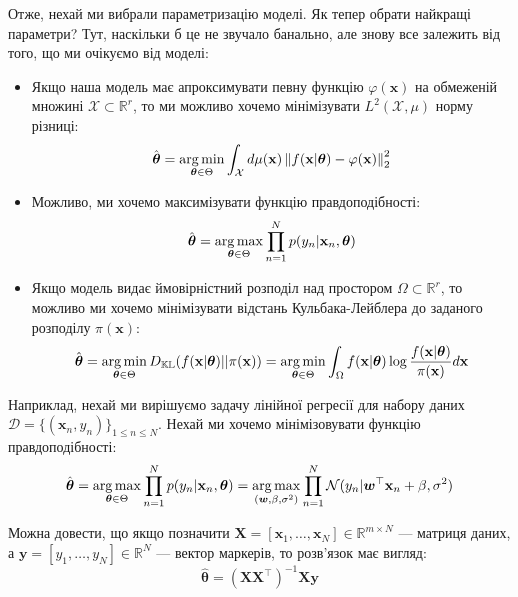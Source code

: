 Отже, нехай ми вибрали параметризацію моделі. Як тепер обрати найкращі параметри?
Тут, наскільки б це не звучало банально, але знову все залежить від того, що ми
очікуємо від моделі:
\begin{itemize}
	\item Якщо наша модель має апроксимувати певну функцію $\varphi(\mathbf{x})$ на 
	обмеженій множині $\mathcal{X} \subset \mathbb{R}^r$, то ми можливо хочемо 
	мінімізувати $L^2(\mathcal{X},\mu)$ норму різниці:
	\begin{equation*}
		\hat{\boldsymbol{\theta}} = \operatorname*{arg\,min}_{\boldsymbol{\theta} \in \Theta} \int_{\mathcal{X}} d\mu(\mathbf{x}) \left\| f(\mathbf{x}|\boldsymbol{\theta}) - \varphi(\mathbf{x}) \right\|_2^2
	\end{equation*}
	\item Можливо, ми хочемо максимізувати функцію правдоподібності:
	\begin{equation*}
		\hat{\boldsymbol{\theta}} = \operatorname*{arg\,max}_{\boldsymbol{\theta} \in \Theta} \prod_{n=1}^N p(y_n|\mathbf{x}_n,\boldsymbol{\theta})
	\end{equation*}
	\item Якщо модель видає ймовірністний розподіл над простором $\Omega \subset \mathbb{R}^r$, то можливо ми хочемо мінімізувати відстань Кульбака-Лейблера до заданого розподілу $\pi(\mathbf{x})$:
	\begin{equation*}
		\hat{\boldsymbol{\theta}} = \operatorname*{arg\,min}_{\boldsymbol{\theta} \in \Theta} D_{\mathbb{KL}}(f(\mathbf{x}|\boldsymbol{\theta})||\pi(\mathbf{x})) = \operatorname*{arg\,min}_{\boldsymbol{\theta} \in \Theta} \int_{\Omega} f(\mathbf{x} | \boldsymbol{\theta}) \log \frac{f(\mathbf{x} | \boldsymbol{\theta})}{\pi(\mathbf{x})}d\mathbf{x}
	\end{equation*}
\end{itemize}

\begin{example}
	Наприклад, нехай ми вирішуємо задачу лінійної регресії для набору даних
	$\mathcal{D} = \{(\mathbf{x}_n, y_n)\}_{1 \leq n \leq N}$. Нехай ми хочемо 
	мінімізовувати функцію правдоподібності:
	\begin{equation}
		\hat{\boldsymbol{\theta}} = \operatorname*{arg\,max}_{\boldsymbol{\theta} \in \Theta} \prod_{n=1}^N p(y_n|\mathbf{x}_n,\boldsymbol{\theta}) = \operatorname*{arg\,max}_{(\boldsymbol{w},\beta,\sigma^2)}\prod_{n=1}^N \mathcal{N}(y_n|\boldsymbol{w}^{\top}\mathbf{x}_n+\beta,\sigma^2)
	\end{equation}

	Можна довести, що якщо позначити $\mathbf{X} = [\mathbf{x}_1,\dots,\mathbf{x}_N] \in \mathbb{R}^{m \times N}$ --- матриця даних, а $\mathbf{y} = [y_1,\dots,y_N] \in \mathbb{R}^N$ --- вектор маркерів, то розв'язок має вигляд:
	\begin{equation}
		\hat{\boldsymbol{\theta}} = (\mathbf{X}\mathbf{X}^{\top})^{-1}\mathbf{X}\mathbf{y}
	\end{equation}
\end{example}

